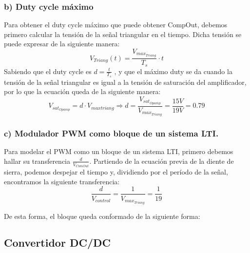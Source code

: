 \documentclass[e4_tp2_main.tex]{subfiles}
\begin{document}
\subsubsection*{b) Duty cycle m\'aximo}
Para obtener el duty cycle máximo que puede obtener CompOut, debemos primero calcular la tensión de la señal triangular en el tiempo. Dicha tensión se puede expresar de la siguiente manera:
\begin{equation}
V_{Triang}(t)= \frac{V_{max_{Triang}}}{T_s} \cdot t
\end{equation} 
Sabiendo que el duty cycle es $ d=\frac{t}{T_s}$  , y que el máximo duty se da cuando la tensión de la señal triangular es igual a la tensión de saturación del amplificador, por lo que la ecuación queda de la siguiente manera:
\begin{equation}
V_{sat_{Opamp}}= d \cdot V_{maxtriang} \Rightarrow d= \frac{V_{sat_{Opamp}}}{V_{max_{Triang}}}=\frac{15 V}{19V}=0.79
\end{equation}
\subsubsection*{c) Modulador PWM como bloque de un sistema LTI.}
Para modelar el PWM como un bloque de un sistema LTI, primero debemos hallar su transferencia $\frac{d}{V_{ComOut}}$. Partiendo de la ecuación previa de la diente de sierra, podemos despejar el tiempo y, dividiendo por el período de la señal, encontramos la siguiente transferencia:
\begin{equation}
\frac{d}{V_{control}}=\frac{1}{V_{max_{Triang}}}=\frac{1}{19}
\end{equation} 

De esta forma, el bloque queda conformado de la siguiente forma:

\begin{center}
\end{center}



\subsection{Convertidor DC/DC}
\end{document}
